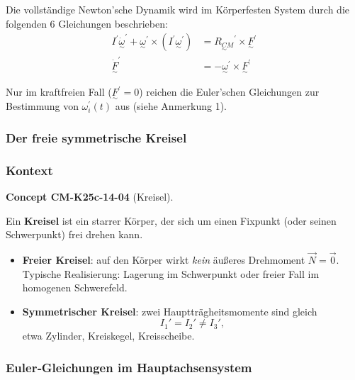 \documentclass[10pt, letterpaper]{article}
\newcommand{\CustomHeading}[3]{%
  \par\medskip\noindent%
  \textbf{#1 #2} \textnormal{(#3)}.\enskip%
}
\newenvironment{CONC}[2]{\begin{unitbox}\CustomHeading{Concept}{#1}{#2}}{\end{unitbox}}
\begin{document}
Die vollständige Newton'sche Dynamik wird im Körperfesten System durch die folgenden 6 Gleichungen beschrieben:
\begin{equation*}
\begin{aligned}
I^\prime \dot{\underset{\sim}{\omega}}^\prime + \underset{\sim}{\omega}^\prime \times (I^\prime \underset{\sim}{\omega}^\prime) &= \underset{\sim}{R_{CM}}^\prime \times \underset{\sim}{F}^\prime \\
\dot{\underset{\sim}{F}}^\prime &= -\underset{\sim}{\omega}^\prime \times \underset{\sim}{F}^\prime
\end{aligned}
\end{equation*}

Nur im kraftfreien Fall ($\underset{\sim}{F}^\prime = 0$) reichen die Euler'schen Gleichungen zur Bestimmung von $\omega_i^\prime(t)$ aus (siehe Anmerkung 1).









\subsubsection{Der freie symmetrische Kreisel}


\subsubsection*{Kontext}

\begin{CONC}{CM-K25c-14-04}{Kreisel}
Ein \textbf{Kreisel} ist ein starrer Körper, der sich um einen Fixpunkt (oder seinen Schwerpunkt) frei drehen kann.  
\begin{itemize}
\item \textbf{Freier Kreisel}: auf den Körper wirkt \emph{kein} äußeres Drehmoment $\vec N = \vec 0$.  
      Typische Realisierung: Lagerung im Schwerpunkt oder freier Fall im homogenen Schwerefeld.  
\item \textbf{Symmetrischer Kreisel}: zwei Hauptträgheitsmomente sind gleich  
      \[
        I_1'=I_2'\neq I_3',
      \]
      etwa Zylinder, Kreiskegel, Kreisscheibe.
\end{itemize}
\end{CONC}

\subsubsection*{Euler‐Gleichungen im Hauptachsensystem}
\end{document}

